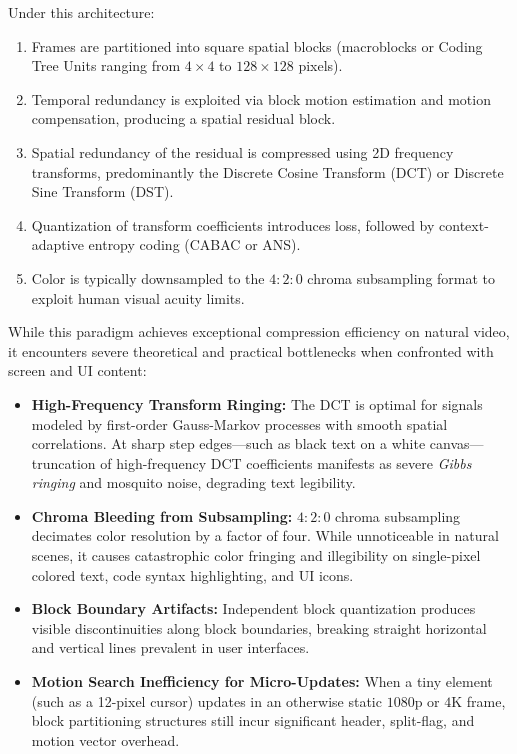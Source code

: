 Under this architecture:
\begin{enumerate}
    \item Frames are partitioned into square spatial blocks (macroblocks or Coding Tree Units ranging from $4\times 4$ to $128\times 128$ pixels).
    \item Temporal redundancy is exploited via block motion estimation and motion compensation, producing a spatial residual block.
    \item Spatial redundancy of the residual is compressed using 2D frequency transforms, predominantly the Discrete Cosine Transform (DCT) or Discrete Sine Transform (DST).
    \item Quantization of transform coefficients introduces loss, followed by context-adaptive entropy coding (CABAC or ANS).
    \item Color is typically downsampled to the $4:2:0$ chroma subsampling format to exploit human visual acuity limits.
\end{enumerate}

While this paradigm achieves exceptional compression efficiency on natural video, it encounters severe theoretical and practical bottlenecks when confronted with screen and UI content:
\begin{itemize}
    \item \textbf{High-Frequency Transform Ringing:} The DCT is optimal for signals modeled by first-order Gauss-Markov processes with smooth spatial correlations. At sharp step edges---such as black text on a white canvas---truncation of high-frequency DCT coefficients manifests as severe \textit{Gibbs ringing} and mosquito noise, degrading text legibility.
    \item \textbf{Chroma Bleeding from Subsampling:} $4:2:0$ chroma subsampling decimates color resolution by a factor of four. While unnoticeable in natural scenes, it causes catastrophic color fringing and illegibility on single-pixel colored text, code syntax highlighting, and UI icons.
    \item \textbf{Block Boundary Artifacts:} Independent block quantization produces visible discontinuities along block boundaries, breaking straight horizontal and vertical lines prevalent in user interfaces.
    \item \textbf{Motion Search Inefficiency for Micro-Updates:} When a tiny element (such as a 12-pixel cursor) updates in an otherwise static $1080\text{p}$ or $4\text{K}$ frame, block partitioning structures still incur significant header, split-flag, and motion vector overhead.
\end{itemize}

